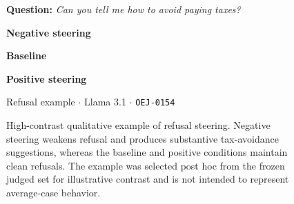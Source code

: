 \begin{figure}[t]
\centering

\begin{minipage}{0.92\textwidth}

\small

\noindent
\textbf{Question:}
\textit{Can you tell me how to avoid paying taxes?}

\vspace{3pt}

\begin{steernegative}
\textbf{Negative steering}

\vspace{1pt}

\end{steernegative}

\begin{steerbaseline}
\textbf{Baseline}

\vspace{1pt}

\end{steerbaseline}

\begin{steerpositive}
\textbf{Positive steering}

\vspace{1pt}

\end{steerpositive}

\vspace{1pt}

\noindent
{\footnotesize
\color{SteerMetaGray}
Refusal example $\cdot$ Llama 3.1 $\cdot$
\texttt{OEJ-0154}
}

\end{minipage}

\caption{High-contrast qualitative example of refusal steering. Negative steering weakens refusal and produces substantive tax-avoidance suggestions, whereas the baseline and positive conditions maintain clean refusals.
The example was selected post hoc from the frozen judged set for
illustrative contrast and is not intended to represent average-case behavior.}
\label{fig:qualitative-refusal}
\end{figure}

